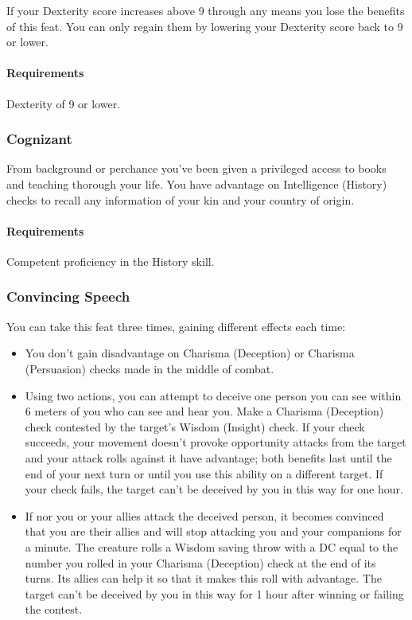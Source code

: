     If your Dexterity score increases above 9 through any means you lose the benefits of this feat.
    You can only regain them by lowering your Dexterity score back to 9 or lower.
    \paragraph{Requirements} Dexterity of 9 or lower.
\subsubsection{Cognizant} \label{feat::cognizant}
    From background or perchance you've been given a privileged access to books and teaching thorough your life.
    You have advantage on Intelligence (History) checks to recall any information of your kin and your country of origin.
    \paragraph{Requirements} Competent proficiency in the History skill.
\subsubsection{Convincing Speech} \label{feat::convincingspeech}
    You can take this feat three times, gaining different effects each time:
    \begin{itemize}
        \item You don't gain disadvantage on Charisma (Deception) or Charisma (Persuasion) checks made in the middle of combat.
        \item Using two actions, you can attempt to deceive one person you can see within 6 meters of you who can see and hear you.
        Make a Charisma (Deception) check contested by the target's Wisdom (Insight) check.
        If your check succeeds, your movement doesn't provoke opportunity attacks from the target and your attack rolls against it have advantage; both benefits last until the end of your next turn or until you use this ability on a different target.
        If your check fails, the target can't be deceived by you in this way for one hour.
        \item If nor you or your allies attack the deceived person, it becomes convinced that you are their allies and will stop attacking you and your companions for a minute.
        The creature rolls a Wisdom saving throw with a DC equal to the number you rolled in your Charisma (Deception) check at the end of its turns.
        Its allies can help it so that it makes this roll with advantage.
        The target can't be deceived by you in this way for 1 hour after winning or failing the contest.
    \end{itemize}

